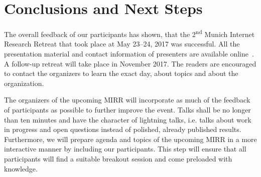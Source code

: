 \section{Conclusions and Next Steps}\label{sec:conclusion}


The overall feedback of our participants has shown, that the 2\textsuperscript{nd} Munich Internet Research Retreat that took place at May 23--24, 2017 was successful. All the presentation material and contact
information of presenters are available online~\cite{mir-materials}. A follow-up retreat will take place in November 2017. The
readers are encouraged to contact the organizers to learn the exact day, about topics and about the organization.

The organizers of the upcoming \ac{MIRR} will incorporate as much of the feedback of participants as possible to further improve the event. Talks shall be no longer than ten minutes and have the character of lightning talks, i.e. talks about work in progress and open questions instead of polished, already published results. Furthermore, we will prepare agenda and topics of the upcoming \ac{MIRR} in a more interactive manner by including our participants. This step will ensure that all participants will find a suitable breakout session and come preloaded with knowledge.
